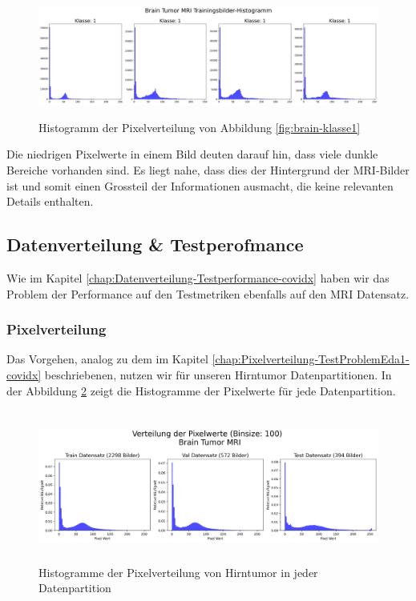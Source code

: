 \begin{figure}[ht]
    \centering
    \includegraphics[width=\linewidth, height=4cm]{01-images/03-data/brain-klasse1-hist.png}
    \caption{Histogramm der Pixelverteilung von Abbildung \ref{fig:brain-klasse1}}
    \label{fig:brain-klasse1-hist}
\end{figure}

Die niedrigen Pixelwerte in einem Bild deuten darauf hin, dass viele dunkle Bereiche vorhanden sind. Es liegt nahe, dass dies der Hintergrund der MRI-Bilder ist und somit einen Grossteil der Informationen ausmacht, die keine relevanten Details enthalten.



\subsection{Datenverteilung \& Testperofmance} \label{chap:Datenverteilung-Testperformance-mri}

Wie im Kapitel \ref{chap:Datenverteilung-Testperformance-covidx} haben wir das Problem der Performance auf den Testmetriken ebenfalls auf den MRI Datensatz. 

\subsubsection{Pixelverteilung} \label{chap:Pixelverteilung-TestProblemEda1-mri}


Das Vorgehen, analog zu dem im Kapitel \ref{chap:Pixelverteilung-TestProblemEda1-covidx} beschriebenen, nutzen wir für unseren Hirntumor Datenpartitionen. In der Abbildung \ref{fig:hist-datapartition-brain} zeigt die Histogramme der Pixelwerte für jede Datenpartition.

\begin{figure}[ht]
    \centering
    \includegraphics[width=\linewidth, height=5cm]{01-images/03-data/brain-Pixelverteilung-Partitionen.png}
    \caption{Histogramme der Pixelverteilung von Hirntumor in jeder Datenpartition}
    \label{fig:hist-datapartition-brain}
\end{figure}

